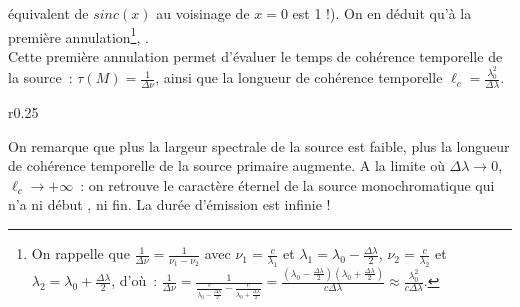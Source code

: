 \documentclass{article}
\newcommand{\mathcolorbox}[2]{\fcolorbox{black}{#1}{$#2$}}
\begin{document}
\begin{itemize}
équivalent de $sinc(x)$ au voisinage de $x=0$ est 1 !). On en déduit
qu'à la première annulation\footnote{On rappelle que
$\frac{1}{\Delta \nu} = \frac{1}{\nu_{1}-\nu_{2}}$ avec $\nu_{1} =
\frac{c}{\lambda_{1}}$ et $\lambda_{1} = \lambda_{0}-\frac{\Delta
\lambda}{2}$, $\nu_{2} = \frac{c}{\lambda_{2}}$ et $\lambda_{2} =
\lambda_{0}+\frac{\Delta \lambda}{2}$, d'où : $\frac{1}{\Delta \nu}
= \frac{1}{\frac{c}{\lambda_{0}-\frac{\Delta
\lambda}{2}}-\frac{c}{\lambda_{0}+\frac{\Delta \lambda}{2}}} = \frac{\left(\lambda_{0}-\frac{\Delta
\lambda}{2}\right)\left(\lambda_{0}+\frac{\Delta \lambda}{2}\right)}{c\Delta\lambda}
\approx \frac{\lambda_{0}^{2}}{c\Delta\lambda}$.}, \mathcolorbox{gray!20}{\tau(M) =
\frac{1}{\Delta \nu}=\frac{\lambda_{0}^{2}}{c\Delta
\lambda}=\frac{\ell_{c}}{c}}.
\\
Cette première annulation permet d'évaluer le temps de cohérence
temporelle de la source : $\tau(M) = \frac{1}{\Delta \nu}$, ainsi
que la longueur de cohérence temporelle $\ell_{c} =
\frac{\lambda_{0}^{2}}{\Delta\lambda}$.


\begin{wrapfigure}{r}{0.25\textwidth}
\caption{}\label{Fig.3}
\end{wrapfigure}


\end{itemize}
On remarque que plus la largeur spectrale de la source est faible,
plus la longueur de cohérence temporelle de la source primaire
augmente. A la limite où $\Delta \lambda \rightarrow 0$, $\ell_{c}
\rightarrow +\infty$ : on retrouve le caractère éternel de la source
monochromatique qui n'a ni début , ni fin. La durée d'émission est
infinie !
\end{document}
